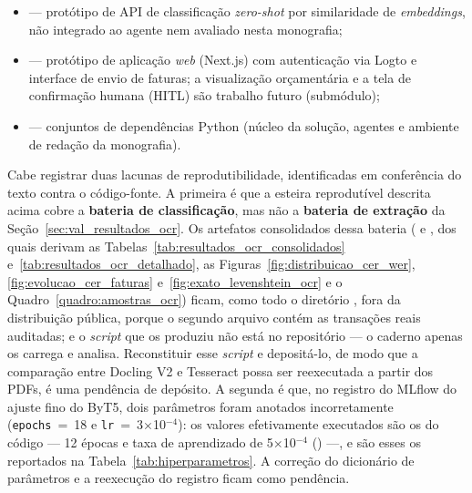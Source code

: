 \begin{apendicesenv}
\begin{itemize}
	\item {} --- protótipo de API de classificação \textit{zero-shot} por similaridade de \textit{embeddings}, não integrado ao agente nem avaliado nesta monografia;
	\item {} --- protótipo de aplicação \textit{web} (Next.js) com autenticação via Logto e interface de envio de faturas; a visualização orçamentária e a tela de confirmação humana (HITL) são trabalho futuro (submódulo);
	\item {} --- conjuntos de dependências Python (núcleo da solução, agentes e ambiente de redação da monografia).
\end{itemize}

Cabe registrar duas lacunas de reprodutibilidade, identificadas em conferência do texto contra o código-fonte. A primeira é que a esteira reprodutível descrita acima cobre a \textbf{bateria de classificação}, mas não a \textbf{bateria de extração} da Seção~\ref{sec:val_resultados_ocr}. Os artefatos consolidados dessa bateria ( e , dos quais derivam as Tabelas~\ref{tab:resultados_ocr_consolidados} e~\ref{tab:resultados_ocr_detalhado}, as Figuras~\ref{fig:distribuicao_cer_wer}, \ref{fig:evolucao_cer_faturas} e~\ref{fig:exato_levenshtein_ocr} e o Quadro~\ref{quadro:amostras_ocr}) ficam, como todo o diretório , fora da distribuição pública, porque o segundo arquivo contém as transações reais auditadas; e o \textit{script} que os produziu não está no repositório --- o caderno  apenas os carrega e analisa. Reconstituir esse \textit{script} e depositá-lo, de modo que a comparação entre Docling V2 e Tesseract possa ser reexecutada a partir dos PDFs, é uma pendência de depósito. A segunda é que, no registro do MLflow do ajuste fino do ByT5, dois parâmetros foram anotados incorretamente (\texttt{epochs}~=~18 e \texttt{lr}~=~3$\times$10$^{-4}$): os valores efetivamente executados são os do código --- 12 épocas e taxa de aprendizado de 5$\times$10$^{-4}$ () ---, e são esses os reportados na Tabela~\ref{tab:hiperparametros}. A correção do dicionário de parâmetros e a reexecução do registro ficam como pendência.


\end{apendicesenv}
